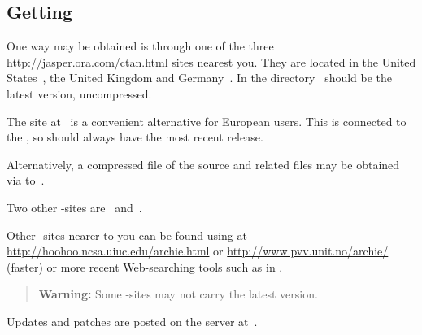 \startdocument
%
\subsection[center]{Getting \protect\latextohtml}
\tableofchildlinks*
\htmlrule
{}%
%
%
\begin{changebar}%
One way \latextohtml may be obtained is through one of the three
%
{http://jasper.ora.com/ctan.html} sites nearest you.  They are
located in the United States
\,,
the United Kingdom
and Germany
\,.
In the directory \CTAN\ should be the latest version, uncompressed.

\smallskip\noindent
{}\begin{changebar}
The site at \CVSsite\ is a convenient alternative for European users.
This is connected to the ,
so should always have the most recent release.
\end{changebar}

%
\smallskip\noindent
Alternatively, a compressed  file of the source and related files 
may be obtained via  to \sourceA\,.

\smallskip\noindent
Two other -sites are \sourceB\ and \sourceC\,.

%
%
\smallskip\noindent
Other -sites nearer to you can be found using  at 
\url{http://hoohoo.ncsa.uiuc.edu/archie.html} or 
\url{http://www.pvv.unit.no/archie/} (faster) 
or more recent Web-searching tools such as 
in .
\begin{quote}
\textbf{Warning: }%
Some -sites may not carry the latest version.
\end{quote}

%
\smallskip\noindent
Updates and patches are posted on the \latextohtml{} server at \patches\,.
\end{changebar}

